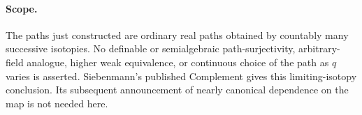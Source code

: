 \paragraph{Scope.}
The paths just constructed are ordinary real paths obtained by
countably many successive isotopies.  No definable or semialgebraic
path-surjectivity, arbitrary-field analogue, higher weak equivalence,
or continuous choice of the path as $q$ varies is asserted.
Siebenmann's published Complement gives this limiting-isotopy
conclusion. Its subsequent announcement of nearly canonical
dependence on the map is not needed here.

